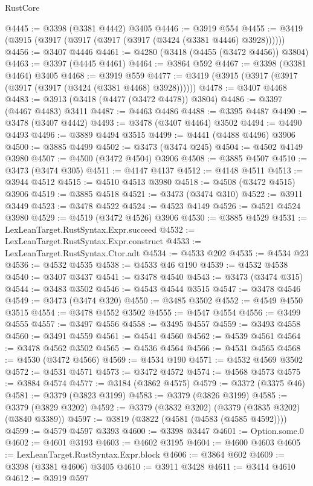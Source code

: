 \begin{lexlean}{RustCore}
\begin{coremodule}
@4445 := @3398 (@3381 @4442) @3405
@4446 := @3919 @554
@4455 := @3419 (@3915 (@3917 (@3917 (@3917 (@3917 (@3424 (@3381 @4446) @3928))))))
@4456 := @3407 @4446
@4461 := @4280 (@3418 (@4455 (@3472 @4456)) @3804)
@4463 := @3397 (@4445 @4461)
@4464 := @3864 @592
@4467 := @3398 (@3381 @4464) @3405
@4468 := @3919 @559
@4477 := @3419 (@3915 (@3917 (@3917 (@3917 (@3917 (@3424 (@3381 @4468) @3928))))))
@4478 := @3407 @4468
@4483 := @3913 (@3418 (@4477 (@3472 @4478)) @3804)
@4486 := @3397 (@4467 @4483) @3411
@4487 := @4463 @4486
@4488 := @3395 @4487
@4490 := @3478 (@3407 @4442)
@4493 := @3478 (@3407 @4464) @3502
@4494 := @4490 @4493
@4496 := @3889 @4494 @3515
@4499 := @4441 (@4488 @4496) @3906
@4500 := @3885 @4499
@4502 := @3473 (@3474 @245)
@4504 := @4502 @4149 @3980
@4507 := @4500 (@3472 @4504) @3906
@4508 := @3885 @4507
@4510 := @3473 (@3474 @305)
@4511 := @4147 @4137
@4512 := @4148 @4511
@4513 := @3944 @4512
@4515 := @4510 @4513 @3980
@4518 := @4508 (@3472 @4515) @3906
@4519 := @3885 @4518
@4521 := @3473 (@3474 @310)
@4522 := @3911 @3449
@4523 := @3478 @4522
@4524 := @4523 @4149
@4526 := @4521 @4524 @3980
@4529 := @4519 (@3472 @4526) @3906
@4530 := @3885 @4529
@4531 := LexLeanTarget.RustSyntax.Expr.succeed
@4532 := LexLeanTarget.RustSyntax.Expr.construct
@4533 := LexLeanTarget.RustSyntax.Ctor.adt
@4534 := @4533 @202
@4535 := @4534 @23
@4536 := @4532 @4535
@4538 := @4533 @46 @190
@4539 := @4532 @4538
@4540 := @3407 @3437
@4541 := @3478 @4540
@4543 := @3473 (@3474 @315)
@4544 := @3483 @3502
@4546 := @4543 @4544 @3515
@4547 := @3478 @4546
@4549 := @3473 (@3474 @320)
@4550 := @3485 @3502
@4552 := @4549 @4550 @3515
@4554 := @3478 @4552 @3502
@4555 := @4547 @4554
@4556 := @3499 @4555
@4557 := @3497 @4556
@4558 := @3495 @4557
@4559 := @3493 @4558
@4560 := @3491 @4559
@4561 := @4541 @4560
@4562 := @4539 @4561
@4564 := @3478 @4562 @3502
@4565 := @4536 @4564
@4566 := @4531 @4565
@4568 := @4530 (@3472 @4566)
@4569 := @4534 @190
@4571 := @4532 @4569 @3502
@4572 := @4531 @4571
@4573 := @3472 @4572
@4574 := @4568 @4573
@4575 := @3884 @4574
@4577 := @3184 (@3862 @4575)
@4579 := @3372 (@3375 @46)
@4581 := @3379 (@3823 @3199)
@4583 := @3379 (@3826 @3199)
@4585 := @3379 (@3829 @3202)
@4592 := @3379 (@3832 @3202) (@3379 (@3835 @3202) (@3840 @3389))
@4597 := @3819 (@3822 (@4581 (@4583 (@4585 @4592))))
@4599 := @4579 @4597 @3393
@4600 := @3398 @3447
@4601 := Option.some.{0}
@4602 := @4601 @3193
@4603 := @4602 @3195
@4604 := @4600 @4603
@4605 := LexLeanTarget.RustSyntax.Expr.block
@4606 := @3864 @602
@4609 := @3398 (@3381 @4606) @3405
@4610 := @3911 @3428
@4611 := @3414 @4610
@4612 := @3919 @597

\end{coremodule}
\end{lexlean}

